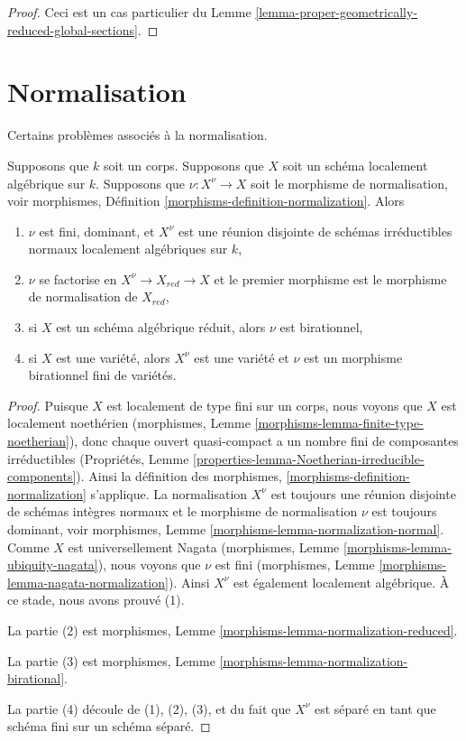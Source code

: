 \begin{proof}
Ceci est un cas particulier du Lemme
\ref{lemma-proper-geometrically-reduced-global-sections}.
\end{proof}




\section{Normalisation}
\label{section-normalization}

\noindent
Certains problèmes associés à la normalisation.

\begin{lemma}
\label{lemma-normalization-locally-algebraic}
Supposons que $k$ soit un corps. Supposons que $X$ soit un
schéma localement algébrique sur $k$. Supposons que $\nu :
X^\nu \to X$ soit le morphisme de normalisation, voir
morphismes, Définition \ref{morphisms-definition-normalization}. Alors
\begin{enumerate}
\item $\nu$ est fini, dominant, et $X^\nu$ est une
réunion disjointe de schémas irréductibles normaux
localement algébriques sur $k$, \item $\nu$ se factorise
en $X^\nu \to X_{red} \to X$ et le premier morphisme est
le morphisme de normalisation de $X_{red}$, \item si $X$
est un schéma algébrique réduit, alors $\nu$ est
birationnel, \item si $X$ est une variété, alors $X^\nu$ est une
variété et $\nu$ est un morphisme birationnel fini de variétés.
\end{enumerate}
\end{lemma}

\begin{proof}
Puisque $X$ est localement de type fini sur un corps,
nous voyons que $X$ est localement noethérien
(morphismes, Lemme
\ref{morphisms-lemma-finite-type-noetherian}), donc chaque
ouvert quasi-compact a un nombre fini de composantes
irréductibles (Propriétés, Lemme
\ref{properties-lemma-Noetherian-irreducible-components}). Ainsi
la définition des morphismes,
\ref{morphisms-definition-normalization} s'applique. La
normalisation $X^\nu$ est toujours une réunion disjointe de schémas
intègres normaux et le morphisme de normalisation $\nu$ est toujours
dominant, voir morphismes, Lemme
\ref{morphisms-lemma-normalization-normal}. Comme $X$ est universellement Nagata
(morphismes, Lemme \ref{morphisms-lemma-ubiquity-nagata}), nous voyons que $\nu$
est fini (morphismes, Lemme \ref{morphisms-lemma-nagata-normalization}). Ainsi
$X^\nu$ est également localement algébrique. À ce stade, nous avons prouvé (1).

\medskip\noindent
La partie (2) est morphismes, Lemme \ref{morphisms-lemma-normalization-reduced}.

\medskip\noindent
La partie (3) est morphismes, Lemme \ref{morphisms-lemma-normalization-birational}.

\medskip\noindent
La partie (4) découle de (1), (2), (3), et du fait que
$X^\nu$ est séparé en tant que schéma fini sur un schéma séparé.
\end{proof}

